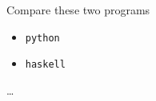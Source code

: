 \begin{frame}
\begin{block}{Compare these two programs}
\begin{itemize}
\item \lstinline{python}
\item \lstinline{haskell}
\end{itemize}
\ldots
\end{block}
\end{frame}
